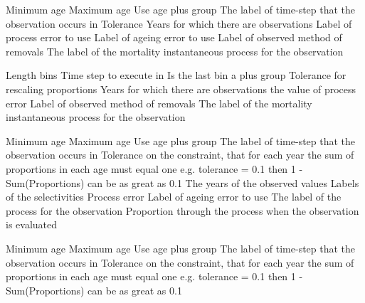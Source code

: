  {Minimum age}
 {Maximum age}
 {Use age plus group}
 {The label of time-step that the observation occurs in}
 {Tolerance}
 {Years for which there are observations}
 {Label of process error to use}
 {Label of ageing error to use}
 {Label of observed method of removals}
 {The label of the mortality instantaneous process for the observation}
\par\textbf{}\par
{} {Length bins}
 {Time step to execute in}
 {Is the last bin a plus group}
 {Tolerance for rescaling proportions}
 {Years for which there are observations}
 {the value of process error}
 {Label of observed method of removals}
 {The label of the mortality instantaneous process for the observation}
\par\textbf{}\par
{} {Minimum age}
 {Maximum age}
 {Use age plus group}
 {The label of time-step that the observation occurs in}
 {Tolerance on the constraint, that for each year the sum of proportions in each age must equal one e.g. tolerance = 0.1 then 1 - Sum(Proportions) can be as great as 0.1}
 {The years of the observed values}
 {Labels of the selectivities}
 {Process error}
 {Label of ageing error to use}
 {The label of the process for the observation}
 {Proportion through the process when the observation is evaluated}
\par\textbf{}\par
{} {Minimum age}
 {Maximum age}
 {Use age plus group}
 {The label of time-step that the observation occurs in}
 {Tolerance on the constraint, that for each year the sum of proportions in each age must equal one e.g. tolerance = 0.1 then 1 - Sum(Proportions) can be as great as 0.1}
